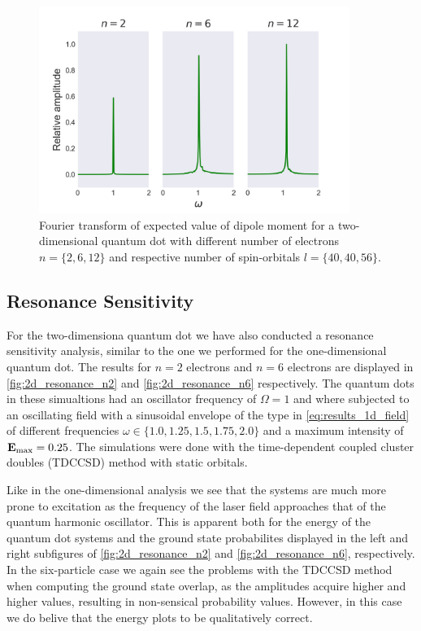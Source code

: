 \begin{figure}
    \centering
    \includegraphics[width=0.9\textwidth]{results/figures/2D/2d_spectrum.png} 
    \caption{Fourier transform of expected value of dipole moment for a
        two-dimensional quantum dot with different number of electrons 
        $n=\{2,6,12\}$ and respective number of spin-orbitals 
        $l=\{40,40,56\}$.
    }
    \label{fig:2d_dipole_spectra}
\end{figure}

\subsection{Resonance Sensitivity}

For the two-dimensiona quantum dot we have also conducted a resonance sensitivity analysis,
similar to the one we performed for the one-dimensional quantum dot. The results for 
$n=2$ electrons and $n=6$ electrons are displayed in \autoref{fig:2d_resonance_n2}
and \autoref{fig:2d_resonance_n6} respectively. The quantum dots in these simualtions 
had an oscillator frequency of $\Omega=1$ and where subjected to an oscillating 
field with a sinusoidal envelope of the type in \autoref{eq:results_1d_field} of 
different frequencies $\omega\in\{1.0,1.25,1.5,1.75,2.0\}$ and a maximum intensity of 
$\vb{E}_\text{max}=0.25$. The simulations were done with the time-dependent coupled 
cluster doubles (TDCCSD) method with static orbitals.

Like in the one-dimensional analysis we see that the systems are much more prone to 
excitation as the frequency of the laser field approaches that of the quantum harmonic 
oscillator. This is apparent both for the energy of the quantum dot systems and the 
ground state probabilites displayed in the left and right subfigures of
\autoref{fig:2d_resonance_n2} and \autoref{fig:2d_resonance_n6}, respectively. In the 
six-particle case we again see the problems with the TDCCSD method when computing the 
ground state overlap, as the amplitudes acquire higher and higher values, resulting 
in non-sensical probability values. However, in this case we do belive that the 
energy plots to be qualitatively correct.

